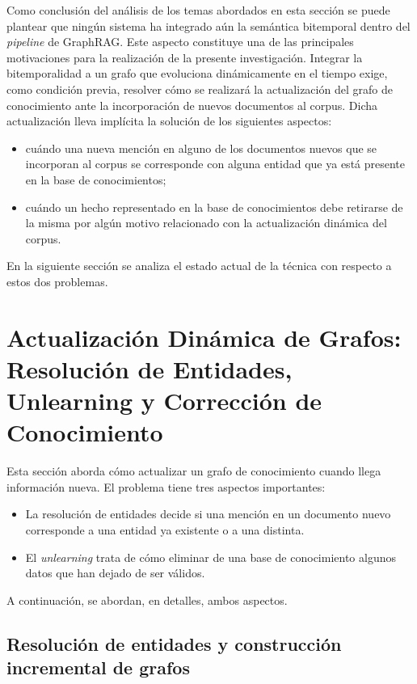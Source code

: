 Como conclusión del análisis de los temas abordados en esta sección se puede plantear que ningún sistema ha integrado aún la semántica bitemporal dentro del \emph{pipeline} de GraphRAG. Este aspecto constituye una de las principales motivaciones para la realización de la presente investigación. Integrar la bitemporalidad a un grafo que evoluciona dinámicamente en el tiempo exige, como condición previa, resolver cómo se realizará la actualización del grafo de conocimiento ante la incorporación de nuevos documentos al corpus. Dicha actualización lleva implícita la solución de los siguientes aspectos:
\begin{itemize}
    \item cuándo una nueva mención en alguno de los documentos nuevos que se incorporan al corpus se corresponde con alguna entidad que ya está presente en la base de conocimientos;
    \item cuándo un hecho representado en la base de conocimientos debe retirarse de la misma por algún motivo relacionado con la actualización dinámica del corpus.
\end{itemize}
En la siguiente sección se analiza el estado actual de la técnica con respecto a estos dos problemas.

\section{Actualización Dinámica de Grafos: Resolución de Entidades, Unlearning y Corrección de Conocimiento}\label{sec:dynamic-update}

Esta sección aborda cómo actualizar un grafo de conocimiento cuando llega información nueva. El problema tiene tres aspectos importantes:
\begin{itemize}
    \item La resolución de entidades decide si una mención en un documento nuevo corresponde a una entidad ya existente o a una distinta.
    \item El \emph{unlearning} trata de cómo eliminar de una base de conocimiento algunos datos que han dejado de ser válidos.
\end{itemize}
A continuación, se abordan, en detalles, ambos aspectos.

\subsection{Resolución de entidades y construcción incremental de grafos}\label{subsec:entity-resolution}

